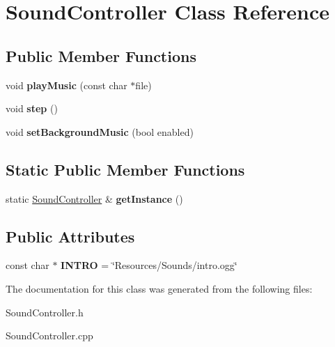 \hypertarget{class_sound_controller}{\section{Sound\-Controller Class Reference}
\label{class_sound_controller}
}
\subsection*{Public Member Functions}
\begin{DoxyCompactItemize}
\item 
\hypertarget{class_sound_controller_a9df9f5c7b8ffdbffc79cc65acf677f54}{void {\bfseries play\-Music} (const char $\ast$file)}\label{class_sound_controller_a9df9f5c7b8ffdbffc79cc65acf677f54}

\item 
\hypertarget{class_sound_controller_a9815a4b5aa7df20c7780e66fd86a8e54}{void {\bfseries step} ()}\label{class_sound_controller_a9815a4b5aa7df20c7780e66fd86a8e54}

\item 
\hypertarget{class_sound_controller_ad9640d15b2e9b32829d051b59ae5de9d}{void {\bfseries set\-Background\-Music} (bool enabled)}\label{class_sound_controller_ad9640d15b2e9b32829d051b59ae5de9d}

\end{DoxyCompactItemize}
\subsection*{Static Public Member Functions}
\begin{DoxyCompactItemize}
\item 
\hypertarget{class_sound_controller_a167ca29530994a8483b090ff044ee49a}{static \hyperlink{class_sound_controller}{Sound\-Controller} \& {\bfseries get\-Instance} ()}\label{class_sound_controller_a167ca29530994a8483b090ff044ee49a}

\end{DoxyCompactItemize}
\subsection*{Public Attributes}
\begin{DoxyCompactItemize}
\item 
\hypertarget{class_sound_controller_afff78ac7ad87e197d22e956efd9da7fc}{const char $\ast$ {\bfseries I\-N\-T\-R\-O} = \char`\"{}Resources/Sounds/intro.\-ogg\char`\"{}}\label{class_sound_controller_afff78ac7ad87e197d22e956efd9da7fc}

\end{DoxyCompactItemize}


The documentation for this class was generated from the following files\-:\begin{DoxyCompactItemize}
\item 
Sound\-Controller.\-h\item 
Sound\-Controller.\-cpp\end{DoxyCompactItemize}
